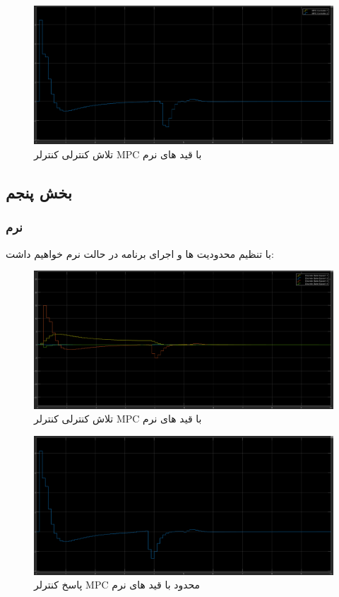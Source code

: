\begin{figure}[H]
	\centering
	\includegraphics[width=1\linewidth]{../img/Q4_Soft_control_effort}
	\caption{تلاش کنترلی کنترلر MPC با قید های نرم}
	\label{fig:q4softcontroleffort}
\end{figure}

\subsection{بخش پنجم}
\subsubsection{نرم}
با تنظیم محدودیت ها و اجرای برنامه در حالت نرم خواهیم داشت:

\begin{figure}[H]
	\centering
	\includegraphics[width=1\linewidth]{../img/Q5_Soft_output}
	\caption{تلاش کنترلی کنترلر MPC با قید های نرم}
	\label{fig:q5softoutput}
\end{figure}

\begin{figure}[H]
	\centering
	\includegraphics[width=1\linewidth]{../img/Q5_Soft_control_effort}
	\caption{پاسخ کنترلر MPC محدود با قید های نرم}
	\label{fig:q5softcontroleffort}
\end{figure}

